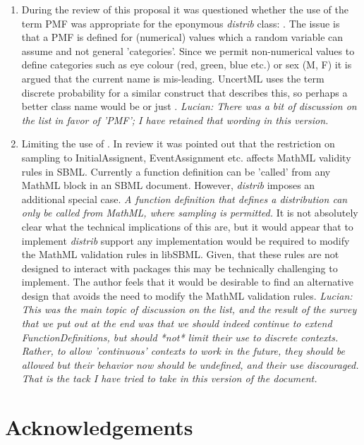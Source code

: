 \documentclass[draftspec]{sbmlpkgspec}
\newcommand{\distribshort}{\emph{distrib}\xspace}
\newcommand{\mathml}{MathML\xspace}
\newcommand{\uncertml}{UncertML\xspace}
\begin{document}
\begin{enumerate}
\item During the review of this proposal it was questioned whether the
  use of the term PMF was appropriate for the eponymous \distribshort
  class: . The issue is that a PMF is defined
  for (numerical) values which a random variable can assume and not
  general 'categories'. Since we permit non-numerical values to define
  categories such as eye colour (red, green, blue etc.) or sex (M, F)
  it is argued that the current name is mis-leading. \uncertml uses
  the term discrete probability for a similar construct that describes
  this, so perhaps a better class name would be
   or just
  .
  \emph{Lucian:  There was a bit of discussion on the list in favor of 'PMF'; I have retained that wording in this version.}

\item Limiting the use of . In review it was
  pointed out that the restriction on sampling to InitialAssignent,
  EventAssignment etc. affects MathML validity rules in SBML. Currently
  a function definition can be 'called' from any \mathml block in an
  SBML document. However, \distribshort imposes an additional special
  case. \emph{A function definition that defines a distribution can
    only be called from \mathml, where sampling is permitted.} It is
  not absolutely clear what the technical implications of this are,
  but it would appear that to implement \distribshort support any
  implementation would be required to modify the \mathml validation
  rules in libSBML. Given, that these rules are not designed to
  interact with packages this may be technically challenging to
  implement. The author feels that it would be desirable to find an
  alternative design that avoids the need to modify the \mathml
  validation rules.
  \emph{Lucian:  This was the main topic of discussion on the list, and the result of the survey that we put out at the end was that we should indeed continue to extend FunctionDefinitions, but should *not* limit their use to discrete contexts.  Rather, to allow 'continuous' contexts to work in the future, they should be allowed but their behavior now should be undefined, and their use discouraged.  That is the tack I have tried to take in this version of the document.}
\end{enumerate}

\section{Acknowledgements}
\label{sec:acknowledgements}
\end{document}
